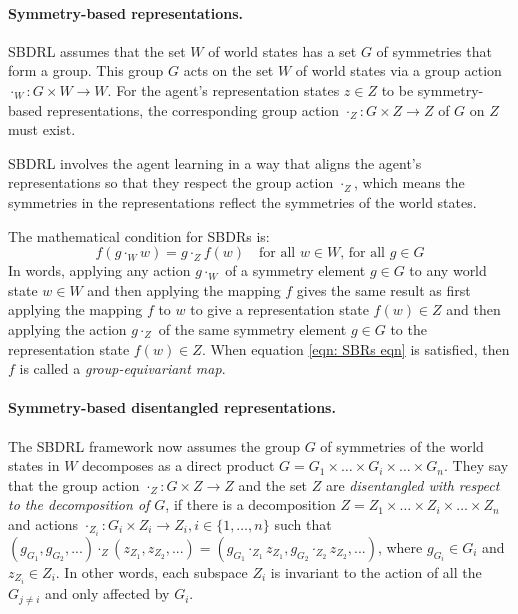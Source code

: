\paragraph{Symmetry-based representations.}
SBDRL assumes that the set $W$ of world states has a set $G$ of symmetries that form a group.
This group $G$ acts on the set $W$ of world states via a group action $\cdot_{W}: G \times W \to W$.
For the agent's representation states $z \in Z$ to be symmetry-based representations, the corresponding group action $\cdot_{Z}: G \times Z \to Z$ of $G$ on $Z$ must exist.

SBDRL involves the agent learning in a way that aligns the agent's representations so that they respect the group action $\cdot_{Z}$, which means the symmetries in the representations reflect the symmetries of the world states.

The mathematical condition for SBDRs is:
\begin{equation}\label{eqn: SBRs eqn}
	f(g \cdot_{W} w) = g \cdot_{Z} f(w) \quad \text{for all $w\in W$, for all $g \in G$}
\end{equation}
In words, applying any action $g \cdot_{W}$ of a symmetry element $g \in G$ to any world state $w \in W$ and then applying the mapping $f$ gives the same result as first applying the mapping $f$ to $w$ to give a representation state $f(w) \in Z$ and then applying the action $g \cdot_Z$ of the same symmetry element $g \in G$ to the representation state $f(w) \in Z$.
When equation \ref{eqn: SBRs eqn} is satisfied, then $f$ is called a \emph{group-equivariant map}.

\paragraph{Symmetry-based disentangled representations.}
The SBDRL framework now assumes the group $G$ of symmetries of the world states in $W$ decomposes as a direct product $G = G_1 \times \hdots \times G_i \times \hdots \times G_n$.
They say that the group action $\cdot_Z : G \times Z \to Z$ and the set $Z$ are \emph{disentangled with respect to the decomposition of $G$}, if there is a decomposition $Z = Z_1 \times \hdots \times Z_i \times \hdots \times Z_n$ and actions $\cdot_{Z_i}: G_i \times Z_i \to Z_i, i \in \{1, \hdots, n\}$ such that $(g_{G_1}, g_{G_2},...) \cdot_Z (z_{Z_1}, z_{Z_2},...) = (g_{G_1} \cdot_{Z_1} z_{Z_1}, g_{G_2} \cdot_{Z_2} z_{Z_2},...)$, where $g_{G_i} \in G_i$ and $z_{Z_i} \in Z_i$.
In other words, each subspace $Z_i$ is invariant to the action of all the $G_{j \neq i}$ and only affected by $G_i$.

